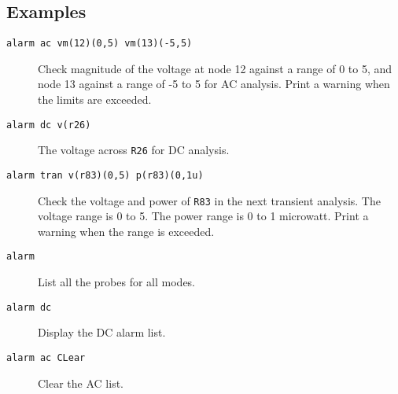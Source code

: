 \subsection{Examples}

\begin{description}

\item[{\tt alarm ac vm(12)(0,5) vm(13)(-5,5)}] Check magnitude of
the voltage at node 12 against a range of 0 to 5, and node 13
against a range of -5 to 5 for AC analysis.  Print a warning when
the limits are exceeded.

\item[{\tt alarm dc v(r26)}] The voltage across {\tt R26} for DC
analysis.

\item[{\tt alarm tran v(r83)(0,5) p(r83)(0,1u)}] Check the voltage
and power of {\tt R83} in the next transient analysis.  The voltage
range is 0 to 5.  The power range is 0 to 1 microwatt.  Print a
warning when the range is exceeded.

\item[{\tt alarm}] List all the probes for all modes.

\item[{\tt alarm dc}] Display the DC alarm list.

\item[{\tt alarm ac CLear}] Clear the AC list.

\end{description}
